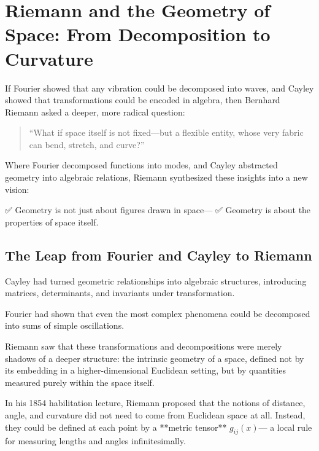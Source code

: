 \section{Riemann and the Geometry of Space: From Decomposition to Curvature}

If Fourier showed that any vibration could be decomposed into waves,  
and Cayley showed that transformations could be encoded in algebra,  
then Bernhard Riemann asked a deeper, more radical question:

\begin{quote}
“What if space itself is not fixed—but a flexible entity, whose very fabric can bend, stretch, and curve?”
\end{quote}

Where Fourier decomposed functions into modes,  
and Cayley abstracted geometry into algebraic relations,  
Riemann synthesized these insights into a new vision:

✅ Geometry is not just about figures drawn in space—  
✅ Geometry is about the properties of space itself.

\bigskip

\subsection*{The Leap from Fourier and Cayley to Riemann}

Cayley had turned geometric relationships into algebraic structures,  
introducing matrices, determinants, and invariants under transformation.

Fourier had shown that even the most complex phenomena could be decomposed into sums of simple oscillations.

Riemann saw that these transformations and decompositions were merely shadows of a deeper structure:  
the intrinsic geometry of a space, defined not by its embedding in a higher-dimensional Euclidean setting,  
but by quantities measured purely within the space itself.

\bigskip

In his 1854 habilitation lecture, Riemann proposed that the notions of distance, angle, and curvature  
did not need to come from Euclidean space at all.  
Instead, they could be defined at each point by a **metric tensor** \( g_{ij}(x) \)—  
a local rule for measuring lengths and angles infinitesimally.

\bigskip

